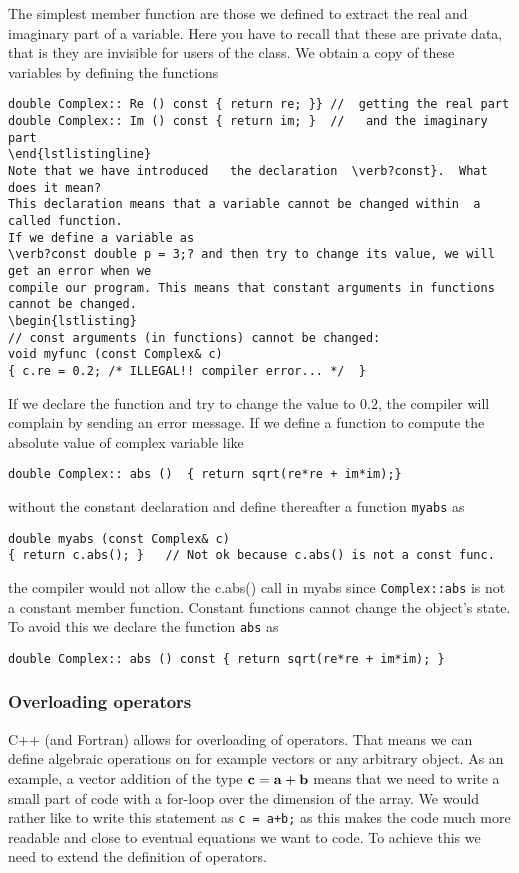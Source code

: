 The simplest member function are those we defined to extract 
the real and imaginary part of a variable. Here you have to recall that these are private data,
that is they are invisible for users of the class.  We obtain a copy of these variables by defining the 
functions
\begin{lstlisting}
double Complex:: Re () const { return re; }} //  getting the real part
double Complex:: Im () const { return im; }  //   and the imaginary part
\end{lstlistingline}
Note that we have introduced   the declaration  \verb?const}.  What does it mean? 
This declaration means that a variable cannot be changed within  a called function.
If we define a variable as 
\verb?const double p = 3;? and then try to change its value, we will get an error when we
compile our program. This means that constant arguments in functions cannot be changed.
\begin{lstlisting}
// const arguments (in functions) cannot be changed:
void myfunc (const Complex& c)
{ c.re = 0.2; /* ILLEGAL!! compiler error... */  }
\end{lstlisting}
If we declare the function and try to change the value to $0.2$, the compiler will complain by sending
an error message. 
If we define a function to compute the absolute value of complex variable like
\begin{lstlisting}
double Complex:: abs ()  { return sqrt(re*re + im*im);}
\end{lstlisting}
without the constant declaration  and define thereafter a function 
\verb?myabs? as
\begin{lstlisting}
double myabs (const Complex& c)
{ return c.abs(); }   // Not ok because c.abs() is not a const func.
\end{lstlisting}
the compiler would not allow the c.abs() call in myabs
since \verb?Complex::abs? is not a constant member function. 
Constant functions cannot change the object's state.
To avoid this we declare the function \verb?abs? as
\begin{lstlisting}
double Complex:: abs () const { return sqrt(re*re + im*im); } 
\end{lstlisting}

\subsubsection{Overloading operators}
C++ (and Fortran) allows  for overloading of operators. That means we can define algebraic operations
on for example vectors or any arbitrary object.   
As an example, a vector addition of the type  ${\bf c} = {\bf a} + {\bf b}$
means that we need to write   a small part of code with a for-loop over the dimension of the array.
We would rather like to write this statement as \verb?c = a+b;? as this makes the code much more
readable and close to eventual equations we want to code.  To achieve this we need to extend the definition of operators.

